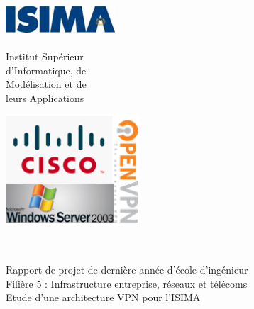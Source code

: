 \begin{titlepage}
	\begin{minipage}{0.5\textwidth}
		\begin{flushleft} \large
			\includegraphics[height=1cm]{images/logo-isima.png}\\
			~\\
			Institut Supérieur\\
			d'Informatique, de\\
			Modélisation et de\\
			leurs Applications
		\end{flushleft}
	\end{minipage}
	\begin{minipage}{0.43\textwidth}
		\begin{flushright} \large
 			\includegraphics[height=4cm]{images/logo.png}\\%
 			~\\
		\end{flushright}
	\end{minipage}

	\vfill
	\begin{center}
		\Hrule \\[0.4cm]
		\Large{Rapport de projet de dernière année d'école d'ingénieur}\\
		\Large Filière 5 : Infrastructure entreprise, réseaux et télécoms\\[1.2cm]
		\Huge{Etude d'une architecture VPN pour l'ISIMA}\\[0.4cm]
		\Hrule \\[0.4cm]
	\end{center}
	

\end{titlepage}
